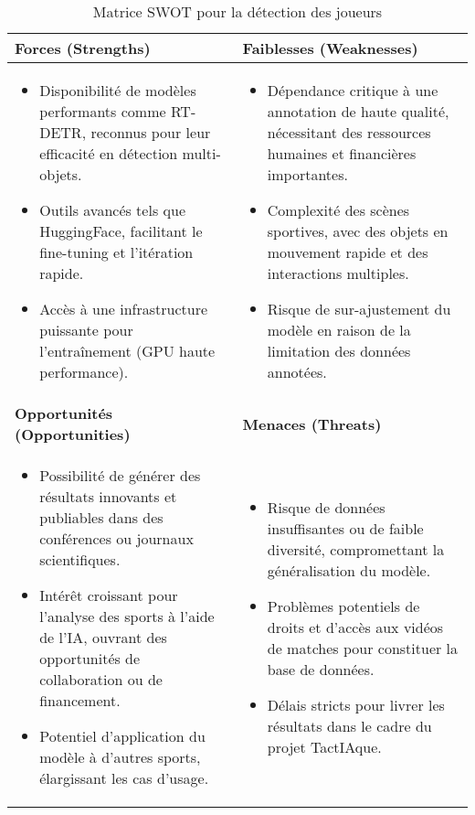 \begin{table} 
    \centering  
    \begin{tabular}{|p{7cm}|p{7cm}|}  
    \hline  
    \textbf{Forces (Strengths)} & \textbf{Faiblesses (Weaknesses)} \\  
    \hline  
    \begin{itemize}
    \item Disponibilité de modèles performants comme RT-DETR, reconnus pour leur efficacité en détection multi-objets. 
     \item Outils avancés tels que HuggingFace, facilitant le fine-tuning et l’itération rapide. 
     \item Accès à une infrastructure puissante pour l’entraînement (GPU haute performance). 
    \end{itemize}
    & 
    \begin{itemize}
     \item Dépendance critique à une annotation de haute qualité, nécessitant des ressources humaines et financières importantes. 
     \item Complexité des scènes sportives, avec des objets en mouvement rapide et des interactions multiples. 
     \item Risque de sur-ajustement du modèle en raison de la limitation des données annotées. 
    \end{itemize}\\
     \hline  
    \textbf{Opportunités (Opportunities)} & \textbf{Menaces (Threats)} \\  
    \hline  
    \begin{itemize}
        \item Possibilité de générer des résultats innovants et publiables dans des conférences ou journaux scientifiques.   
        \item Intérêt croissant pour l’analyse des sports à l’aide de l’IA, ouvrant des opportunités de collaboration ou de financement.  
        \item Potentiel d’application du modèle à d’autres sports, élargissant les cas d’usage.
    \end{itemize}&
    \begin{itemize}
        \item Risque de données insuffisantes ou de faible diversité, compromettant la généralisation du modèle. 
        \item Problèmes potentiels de droits et d’accès aux vidéos de matches pour constituer la base de données. 
        \item Délais stricts pour livrer les résultats dans le cadre du projet TactIAque. 
    \end{itemize}\\
    \hline  
    \end{tabular}  
    \caption{Matrice SWOT pour la détection des joueurs}  
\end{table}  

